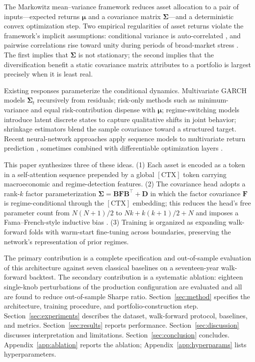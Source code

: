 \documentclass[11pt]{article}
\newcommand{\CTX}{[\mathrm{CTX}]}
\newcommand{\Sig}{\boldsymbol{\Sigma}}
\newcommand{\bmu}{\boldsymbol{\mu}}
\newcommand{\bB}{\mathbf{B}}
\newcommand{\bF}{\mathbf{F}}
\newcommand{\bD}{\mathbf{D}}
\begin{document}
The Markowitz mean--variance framework \citep{markowitz1952} reduces
asset allocation to a pair of inputs---expected returns $\bmu$ and a
covariance matrix $\Sig$---and a deterministic convex optimization step.
Two empirical regularities of asset returns violate the framework's
implicit assumptions: conditional variance is auto-correlated
\citep{bollerslev1986}, and pairwise correlations rise toward unity
during periods of broad-market stress \citep{longin2001}. The first
implies that $\Sig$ is not stationary; the second implies that the
diversification benefit a static covariance matrix attributes to a
portfolio is largest precisely when it is least real.

Existing responses parameterize the conditional dynamics. Multivariate
GARCH \citep{engle2002,bauwens2006} models $\Sig_t$ recursively from
residuals; risk-only methods such as minimum-variance and equal
risk-contribution \citep{maillard2010} dispense with $\bmu$;
regime-switching models \citep{hamilton1989,ang2002} introduce latent
discrete states to capture qualitative shifts in joint behavior;
shrinkage estimators \citep{ledoit2004} blend the sample covariance
toward a structured target. Recent neural-network approaches apply
sequence models to multivariate return prediction
\citep{li2021,wang2022}, sometimes combined with differentiable
optimization layers \citep{donti2017,butler2023}.

This paper synthesizes three of these ideas. (1) Each asset is encoded
as a token in a self-attention sequence prepended by a global $\CTX$
token carrying macroeconomic and regime-detection features.
(2) The covariance head adopts a rank-$k$ factor parameterization
\(
\Sig = \bB \bF \bB^\top + \bD
\)
in which the factor covariance $\bF$ is regime-conditional through the
$\CTX$ embedding; this reduces the head's free parameter count from
$N(N{+}1)/2$ to $Nk + k(k{+}1)/2 + N$ and imposes a Fama--French-style
inductive bias \citep{fama1993}. (3) Training is organized as expanding
walk-forward folds with warm-start fine-tuning across boundaries,
preserving the network's representation of prior regimes.

The primary contribution is a complete specification and out-of-sample
evaluation of this architecture against seven classical baselines on a
seventeen-year walk-forward backtest. The secondary contribution is a
systematic ablation: eighteen single-knob perturbations of the
production configuration are evaluated and all are found to reduce
out-of-sample Sharpe ratio. Section~\ref{sec:method} specifies the
architecture, training procedure, and portfolio-construction step.
Section~\ref{sec:experiments} describes the dataset, walk-forward
protocol, baselines, and metrics. Section~\ref{sec:results} reports
performance. Section~\ref{sec:discussion} discusses interpretation and
limitations. Section~\ref{sec:conclusion} concludes.
Appendix~\ref{app:ablation} reports the ablation;
Appendix~\ref{app:hyperparams} lists hyperparameters.
\end{document}
